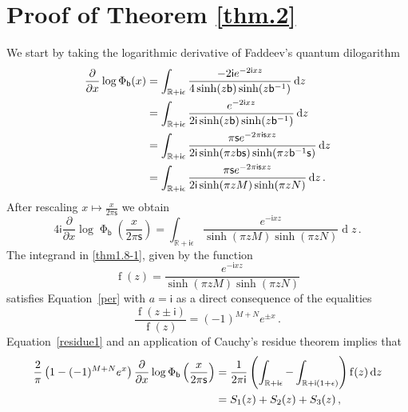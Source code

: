 \documentclass[12pt]{amsart}
\theoremstyle{definition}
\newcommand{\im}{\mathsf{i}}
\newcommand{\fad}[1]{\operatorname{\Phi}_{#1}}
\begin{document}
\section{Proof of Theorem \ref{thm.2}}
We start by taking the logarithmic derivative of Faddeev's quantum dilogarithm
\begin{align}
\frac{\partial}{\partial x}\log \fad{\mathsf{b}}(x)
& =\int_{\mathbb{R}+\im\epsilon}
\frac{-2\im e^{-2\im xz}}{4\sinh(z\mathsf{b})\sinh(z\mathsf{b}^{-1})}
\operatorname{d}\!z \\ \notag & 
=\int_{\mathbb{R}+\im\epsilon}
\frac{ e^{-2\im xz}}{2\im \sinh(z\mathsf{b})\sinh(z\mathsf{b}^{-1})}
\operatorname{d}\!z\\ \notag &
=\int_{\mathbb{R}+\im\epsilon}
\frac{\pi\mathsf{s}e^{-2\pi\im \mathsf{s}xz}}{2\im \sinh(\pi z\mathsf{b}\mathsf{s})
\sinh(\pi z\mathsf{b}^{-1}\mathsf{s})}\operatorname{d}\!z \\ \notag &
=\int_{\mathbb{R}+\im\epsilon}
\frac{ \pi\mathsf{s}e^{-2\pi\im \mathsf{s}xz}}{2\im \sinh(\pi zM)\sinh(\pi zN)}
\operatorname{d}\!z \,.
\end{align}
After rescaling $x\mapsto \frac{x}{2\pi\mathsf{s}}$ we obtain
\begin{equation}
\label{thm1.8-1}
4\im \frac{\partial}{\partial x}
\log \fad{\mathsf{b}}\left(\frac{x}{2\pi\mathsf{s}}\right)
=\int_{\mathbb{R}+\im\epsilon}
\frac{e^{-\im xz}}{ \sinh(\pi zM)\sinh(\pi zN)}\operatorname{d}\!z\,.
\end{equation}
The integrand in \eqref{thm1.8-1}, given by the function
\begin{equation}
\operatorname{f}(z)= \frac{e^{-\im xz}}{ \sinh(\pi zM)\sinh(\pi zN)}
\end{equation}
satisfies Equation~\eqref{per} with $a=\im$ as a direct consequence of the 
equalities
\begin{equation}
\frac{\operatorname{f}(z\pm\im)}{\operatorname{f}(z)}=(-1)^{M+N} e^{\pm x} \,.
\end{equation}
Equation~\eqref{residue1} and an application of Cauchy's residue
theorem implies that
\begin{align}
\notag
\frac{2}{\pi}\left(1-(-1)^{M+N} e^{x}\right)
\frac{\partial}{\partial x}
\log \fad{\mathsf{b}}\left(\frac{x}{2\pi\mathsf{s}}\right)
&=\frac{1}{2\pi\im}\left( 
\int_{\mathbb{R}+\im\epsilon}-\int_{\mathbb{R}+\im(1+\epsilon)}\right)
\operatorname{f}(z)\operatorname{d}\!z\\ \label{eq.Phi123} &
=
S_1(z) + S_2(z) + S_3(z)\,,
\end{align}
\end{document}
